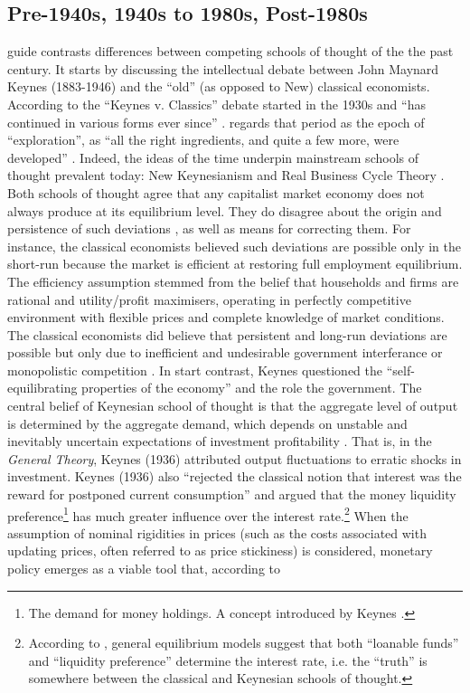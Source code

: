 \subsection{Pre-1940s, 1940s to 1980s, Post-1980s}
\textcite{snowdon_1994_a} guide contrasts differences between competing schools of thought of the the past century. It starts by discussing the intellectual debate between John Maynard Keynes (1883-1946) and the ``old'' (as opposed to New) classical economists. According to \citereset\textcite[42]{snowdon_1994_a} the ``Keynes v. Classics'' debate started in the 1930s and ``has continued in various forms ever since'' \parencite[42]{snowdon_1994_a}. \textcite{blanchard_2000_what} regards that period as the epoch of ``exploration'', as ``all the right ingredients, and quite a few more, were developed'' \parencite[1376]{blanchard_2000_what}. Indeed, the ideas of the time underpin mainstream schools of thought prevalent today: New Keynesianism and Real Business Cycle Theory \parencites[1]{jordigal_2015_monetary}[42]{snowdon_1994_a}. Both schools of thought agree that any capitalist market economy does not always produce at its equilibrium level. They do disagree about the origin and persistence of such deviations \parencite[43]{snowdon_1994_a}, as well as means for correcting them. For instance, the classical economists believed such deviations are possible only in the short-run because the market is efficient at restoring full employment equilibrium. The efficiency assumption stemmed from the belief that households and firms are rational and utility/profit maximisers, operating in perfectly competitive environment with flexible prices and complete knowledge of market conditions. The classical economists did believe that persistent and long-run deviations are possible but only due to inefficient and undesirable government interferance or monopolistic competition \parencite[43]{snowdon_1994_a}. In start contrast, Keynes questioned the ``self-equilibrating properties of the economy'' \parencite[89]{snowdon_1994_a} and the role the government. The central belief of Keynesian school of thought is that the aggregate level of output is determined by the aggregate demand, which depends on unstable and inevitably uncertain expectations of investment profitability \parencite[65]{snowdon_1994_a}. That is, in the \textit{General Theory}, Keynes (1936) attributed output fluctuations to erratic shocks in investment. Keynes (1936) also ``rejected the classical notion that interest was the reward for postponed current consumption'' \parencite[66]{snowdon_1994_a} and argued that the money liquidity preference\footnote{The demand for money holdings. A concept introduced by Keynes \parencite[66]{snowdon_1994_a}.} has much greater influence over the interest rate.\footnote{According to \textcite[1380]{blanchard_2000_what}, general equilibrium models suggest that both ``loanable funds'' and ``liquidity preference'' determine the interest rate, i.e. the ``truth'' is somewhere between the classical and Keynesian schools of thought.} When the assumption of nominal rigidities in prices (such as the costs associated with updating prices, often referred to as price stickiness) is considered, monetary policy emerges as a viable tool that, according to 